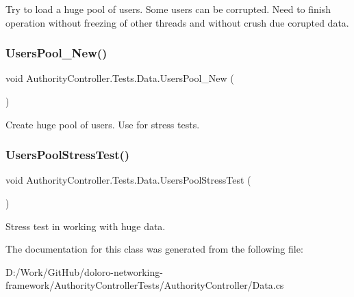 Try to load a huge pool of users. Some users can be corrupted. Need to finish operation without freezing of other threads and without crush due corupted data. 

\mbox{\label{class_authority_controller_1_1_tests_1_1_data_a770588d92222eb045fcd482646e44c9f}} 
\subsubsection{\texorpdfstring{Users\+Pool\+\_\+\+New()}{UsersPool\_New()}}
{\footnotesize\ttfamily void Authority\+Controller.\+Tests.\+Data.\+Users\+Pool\+\_\+\+New (\begin{DoxyParamCaption}{ }\end{DoxyParamCaption})}



Create huge pool of users. Use for stress tests. 

\mbox{\label{class_authority_controller_1_1_tests_1_1_data_a388eaa4ae3a3a646054856f459eb225c}} 
\subsubsection{\texorpdfstring{Users\+Pool\+Stress\+Test()}{UsersPoolStressTest()}}
{\footnotesize\ttfamily void Authority\+Controller.\+Tests.\+Data.\+Users\+Pool\+Stress\+Test (\begin{DoxyParamCaption}{ }\end{DoxyParamCaption})}



Stress test in working with huge data. 



The documentation for this class was generated from the following file\+:\begin{DoxyCompactItemize}
\item 
D\+:/\+Work/\+Git\+Hub/doloro-\/networking-\/framework/\+Authority\+Controller\+Tests/\+Authority\+Controller/Data.\+cs\end{DoxyCompactItemize}
